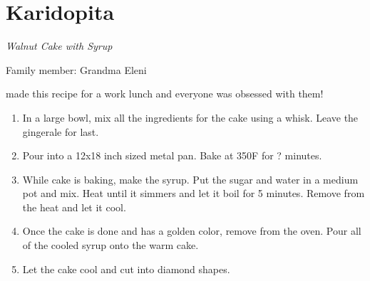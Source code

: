 \chapter{Karidopita}
\label{ch:karidopita}
\textit{Walnut Cake with Syrup}

Family member: Grandma Eleni


 made this recipe for a work lunch and everyone was obsessed with them!

\begin{enumerate}
    \item In a large bowl, mix all the ingredients for the cake using a whisk. Leave the gingerale for last.
    \item Pour into a 12x18 inch sized metal pan. Bake at 350\degree F for ? minutes.
    \item While cake is baking, make the syrup. Put the sugar and water in a medium pot and mix. Heat until it simmers and let it boil for 5 minutes. Remove from the heat and let it cool.
    \item Once the cake is done and has a golden color, remove from the oven. Pour all of the cooled syrup onto the warm cake.
    \item Let the cake cool and cut into diamond shapes.
\end{enumerate}

